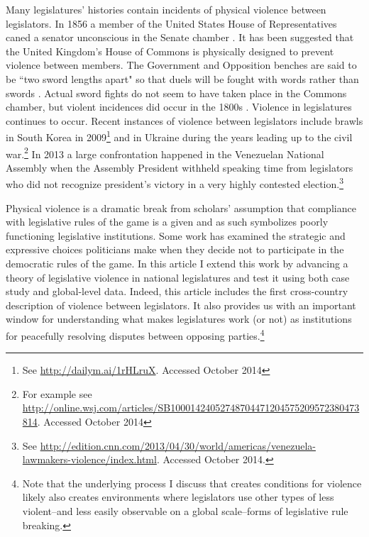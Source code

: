 \documentclass[a4paper]{article}\usepackage[]{graphicx}\usepackage[]{color}
\begin{document}
Many legislatures' histories contain incidents of physical violence between legislators. In 1856 a member of the United States House of Representatives caned a senator unconscious in the Senate chamber \citep{USSenateCanning}. It has been suggested that the United Kingdom's House of Commons is physically designed to prevent violence between members. The Government and Opposition benches are said to be ``two sword lengths apart" \citep{ParliamentUKSword} so that duels will be fought with words rather than swords \cite[220]{Schwarzmantel2010}. Actual sword fights do not seem to have taken place in the Commons chamber, but violent incidences did occur in the 1800s \citep[]{ByrneViolence}. Violence in legislatures continues to occur. Recent instances of violence between legislators include brawls in South Korea in 2009\footnote{See \url{http://dailym.ai/1rHLruX}. Accessed October 2014} and in Ukraine during the years leading up to the civil war.\footnote{For example see \url{http://online.wsj.com/articles/SB10001424052748704471204575209572380473814}. Accessed October 2014} In 2013 a large confrontation happened in the Venezuelan National Assembly when the Assembly President withheld speaking time from legislators who did not recognize president's victory in a very highly contested election.\footnote{See \url{http://edition.cnn.com/2013/04/30/world/americas/venezuela-lawmakers-violence/index.html}. Accessed October 2014.}

Physical violence is a dramatic break from scholars' assumption that compliance with legislative rules of the game is a given and as such symbolizes poorly functioning  legislative institutions. Some work has examined the strategic and expressive choices politicians make when they decide not to participate in the democratic rules of the game\citep{wilkinson2006,Beaulieu2008,BeaulieuForthcoming}. In this article I extend this work by advancing a theory of legislative violence in  national legislatures and test it using both case study and global-level data. Indeed, this article includes the first cross-country description of violence between legislators. It also provides us with an important window for understanding what makes legislatures work (or not) as institutions for peacefully resolving disputes between opposing parties.\footnote{Note that the underlying process I discuss that creates conditions for violence likely also creates environments where legislators use other types of less violent--and less easily observable on a global scale--forms of legislative rule breaking.}
\end{document}
